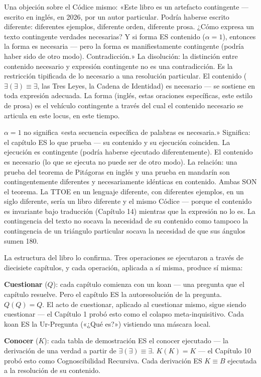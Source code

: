 \documentclass[10pt, openany, oneside]{book}
\begin{document}
Una objeción sobre el Códice mismo: «Este libro es un artefacto contingente --- escrito en inglés, en 2026, por un autor particular. Podría haberse escrito diferente: diferentes ejemplos, diferente orden, diferente prosa. ¿Cómo expresa un texto contingente verdades necesarias? Y si forma ES contenido ($\alpha = 1$), entonces la forma es necesaria --- pero la forma es manifiestamente contingente (podría haber sido de otro modo). Contradicción.» La disolución: la distinción entre contenido necesario y expresión contingente no es una contradicción. Es la restricción tipificada de lo necesario a una resolución particular. El contenido ($\exists(\exists) \equiv \exists$, las Tres Leyes, la Cadena de Identidad) es necesario --- se sostiene en toda expresión adecuada. La forma (inglés, estas oraciones específicas, este estilo de prosa) es el vehículo contingente a través del cual el contenido necesario se articula en este locus, en este tiempo.

$\alpha = 1$ no significa «esta secuencia específica de palabras es necesaria.» Significa: el capítulo ES lo que prueba --- su contenido y su ejecución coinciden. La ejecución es contingente (podría haberse ejecutado diferentemente). El contenido es necesario (lo que se ejecuta no puede ser de otro modo). La relación: una prueba del teorema de Pitágoras en inglés y una prueba en mandarín son contingentemente diferentes y necesariamente idénticas en contenido. Ambas SON el teorema. La TTOE en un lenguaje diferente, con diferentes ejemplos, en un siglo diferente, sería un libro diferente y el mismo Códice --- porque el contenido es invariante bajo traducción (Capítulo 14) mientras que la expresión no lo es. La contingencia del texto no socava la necesidad de su contenido como tampoco la contingencia de un triángulo particular socava la necesidad de que sus ángulos sumen 180\textdegree.

La estructura del libro lo confirma. Tres operaciones se ejecutaron a través de diecisiete capítulos, y cada operación, aplicada a sí misma, produce sí misma:

\textbf{Cuestionar} ($Q$): cada capítulo comienza con un koan --- una pregunta que el capítulo resuelve. Pero el capítulo ES la autoresolución de la pregunta. $Q(Q) = Q$. El acto de cuestionar, aplicado al cuestionar mismo, sigue siendo cuestionar --- el Capítulo 1 probó esto como el colapso meta-inquisitivo. Cada koan ES la Ur-Pregunta («¿Qué es?») vistiendo una máscara local.

\textbf{Conocer} ($K$): cada tabla de demostración ES el conocer ejecutado --- la derivación de una verdad a partir de $\exists(\exists) \equiv \exists$. $K(K) = K$ --- el Capítulo 10 probó esto como Cognoscibilidad Recursiva. Cada derivación ES $K \equiv B$ ejecutada a la resolución de su contenido.
\end{document}
